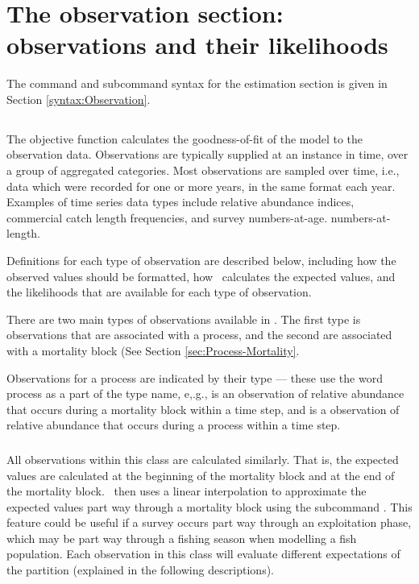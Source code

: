 \section{The observation section: observations and their likelihoods\label{sec:Observation}}

The command and subcommand syntax for the estimation section is given in Section \ref{syntax:Observation}.

\subsection{}

The objective function calculates the goodness-of-fit of the model to the observation data. Observations are typically supplied at an instance in time, over a group of aggregated categories. Most observations are sampled over time, i.e., data which were recorded for one or more years, in the same format each year. Examples of time series data types include relative abundance indices, commercial catch length frequencies, and survey \ifAgeBased numbers-at-age. \else numbers-at-length. \fi

Definitions for each type of observation are described below, including how the observed values should be formatted, how \CNAME\ calculates the expected values, and the likelihoods that are available for each type of observation.

There are two main types of observations available in \CNAME. The first type is observations that are associated with a process, and the second are associated with a mortality block (See Section \ref{sec:Process-Mortality}.

Observations for a process are indicated by their type --- these use the word process as a part of the type name, e,.g.,  is an observation of relative abundance that occurs during a mortality block within a time step, and  is a observation  of relative abundance that occurs during a process within a time step.

\subsubsection{}\label{sec:MortalityBlockObservations}

All observations within this class are calculated similarly. That is, the expected values are calculated at the beginning of the mortality block and at the end of the mortality block. \CNAME\ then uses a linear interpolation to approximate the expected values part way through a mortality block using the subcommand . This feature could be useful if a survey occurs part way through an exploitation phase, which may be part way through a fishing season when modelling a fish population. Each observation in this class will evaluate different expectations of the partition (explained in the following descriptions).

